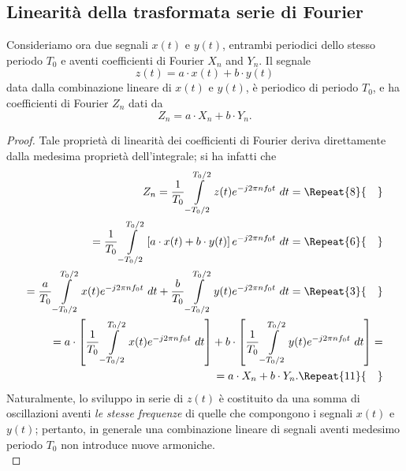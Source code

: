 \documentclass[12pt,oneside,openany]{memoir}
\numberwithin{equation}{subsection}
\newcommand{\quads}[1]{\Repeat{#1}{\quad}}
\newcommand{\dt}{\ dt}
\begin{document}
\newpage
\subsection{Linearit\`a della trasformata serie di Fourier}
Consideriamo ora due segnali $x(t)$ e $y(t)$, entrambi periodici dello stesso periodo $T_0$ e aventi coefficienti di Fourier $X_n$ and $Y_n$. Il segnale
\begin{equation}
	z(t) = a \cdot x(t) + b \cdot y(t)
\end{equation}
data dalla combinazione lineare di $x(t)$ e $y(t)$, \`e periodico di periodo $T_0$, e ha coefficienti di Fourier $Z_n$ dati da
\begin{equation}
	Z_n = a \cdot X_n + b \cdot Y_n.
\end{equation}
\begin{proof}
Tale propriet\`a di linearit\`a dei coefficienti di Fourier deriva direttamente dalla medesima propriet\`a dell'integrale; si ha infatti che
\begin{equation}
\begin{split}
	Z_n = \frac{1}{T_0} \int\displaylimits_{-T_0/2}^{T_0/2} z(t) e^{-j 2 \pi n f_0 t} \dt =
	\quads{8}
	\\
	= \frac{1}{T_0} \int\displaylimits_{-T_0/2}^{T_0/2} \left[a \cdot x(t) + b \cdot y(t)\right] e^{-j 2 \pi n f_0 t} \dt =
	\quads{6}
	\\
	= \frac{a}{T_0} \int\displaylimits_{-T_0/2}^{T_0/2} x(t) e^{-j 2 \pi n f_0 t} \dt + \frac{b}{T_0} \int\displaylimits_{-T_0/2}^{T_0/2} y(t) e^{-j 2 \pi n f_0 t} \dt =
	\quads{3}
	\\
	= a \cdot \left[\frac{1}{T_0} \int\displaylimits_{-T_0/2}^{T_0/2} x(t) e^{-j 2 \pi n f_0 t} \dt \right] + b \cdot \left[\frac{1}{T_0} \int\displaylimits_{-T_0/2}^{T_0/2} y(t) e^{-j 2 \pi n f_0 t} \dt \right] =
	\\
	= a \cdot X_n + b \cdot Y_n.
	\quads{11}
\end{split}
\end{equation}
Naturalmente, lo sviluppo in serie di $z(t)$ \`e costituito da una somma di oscillazioni aventi \textit{le stesse frequenze} di quelle che compongono i segnali $x(t)$ e $y(t)$; pertanto, in generale una combinazione lineare di segnali aventi medesimo periodo $T_0$ non introduce nuove armoniche.\\
\end{proof}
\end{document}
